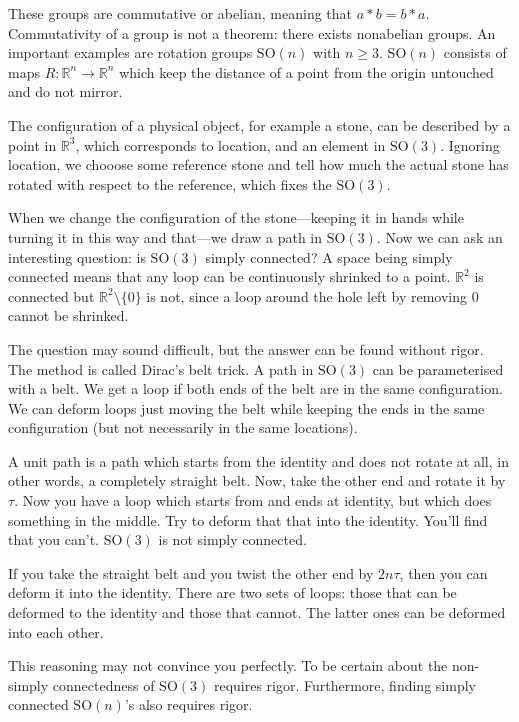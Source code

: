 \documentclass[11pt,oneside,%
]{memoir}
\newcommand{\RR}{\mathbb{R}}
\begin{document}
These groups are commutative or abelian, meaning that \(a*b=b*a\). Commutativity of a group is not a theorem: there exists nonabelian groups. An important examples are rotation groups \(\mathrm{SO}(n)\) with \(n\geq3\). \(\mathrm{SO}(n)\) consists of maps \(R:\RR^n\rightarrow\RR^n\) which keep the distance of a point from the origin untouched and do not mirror.%

The configuration of a physical object, for example a stone, can be described by a point in \(\RR^3\), which corresponds to location, and an element in \(\mathrm{SO}(3)\). Ignoring location, we chooose some reference stone and tell how much the actual stone has rotated with respect to the reference, which fixes the \(\mathrm{SO}(3)\).

When we change the configuration of the stone---keeping it in hands while turning it in this way and that---we draw a path in \(\mathrm{SO}(3)\). Now we can ask an interesting question: is \(\mathrm{SO}(3)\) simply connected? A space being simply connected means that any loop can be continuously shrinked to a point. \(\RR^2\) is connected but \(\RR^2\setminus\lbrace0\rbrace\) is not, since a loop around the hole left by removing \(0\) cannot be shrinked.

The question may sound difficult, but the answer can be found without rigor. The method is called Dirac's belt trick. A path in \(\mathrm{SO}(3)\) can be parameterised with a belt. We get a loop if both ends of the belt are in the same configuration. We can deform loops just moving the belt while keeping the ends in the same configuration (but not necessarily in the same locations).

A unit path is a path which starts from the identity and does not rotate at all, in other words, a completely straight belt. Now, take the other end and rotate it by \(\tau\). Now you have a loop which starts from and ends at identity, but which does something in the middle. Try to deform that that into the identity. You'll find that you can't. \(\mathrm{SO}(3)\) is not simply connected.

If you take the straight belt and you twist the other end by \(2n\tau\), then you can deform it into the identity. There are two sets of loops: those that can be deformed to the identity and those that cannot. The latter ones can be deformed into each other.

This reasoning may not convince you perfectly. To be certain about the non-simply connectedness of \(\mathrm{SO}(3)\) requires rigor. Furthermore, finding simply connected \(\mathrm{SO}(n)\)'s also requires rigor.
\end{document}

